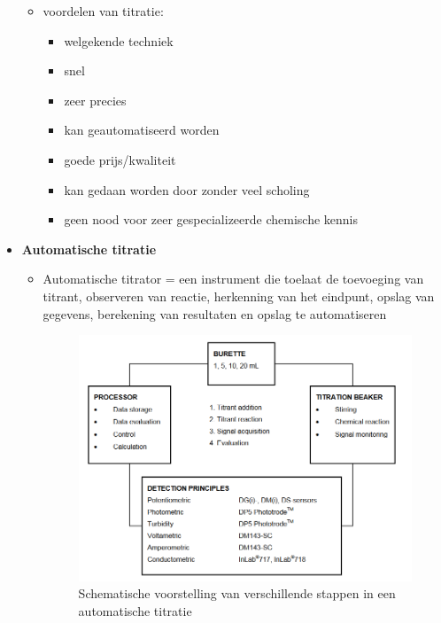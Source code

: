 \documentclass[10pt]{report}
\begin{document}
\begin{itemize}
\begin{itemize}
            \newpage
            \item voordelen van titratie:
                \begin{itemize}
                    \item welgekende techniek
                    \item snel
                    \item zeer precies
                    \item kan geautomatiseerd worden
                    \item goede prijs/kwaliteit
                    \item kan gedaan worden door zonder veel scholing
                    \item geen nood voor zeer gespecializeerde chemische kennis
                \end{itemize}
        \end{itemize}
    \item \textbf{Automatische titratie}
        \begin{itemize}
            \item Automatische titrator = een instrument die toelaat de toevoeging van titrant, observeren van reactie, herkenning van het eindpunt, opslag van gegevens, berekening van resultaten en opslag te automatiseren
            \begin{figure}[h]
                \centering
                \includegraphics[width=1\textwidth]{rfpcir.png}
                \caption{Schematische voorstelling van verschillende stappen in een automatische titratie}
            \end{figure}

\end{itemize}
\end{itemize}
\end{document}
